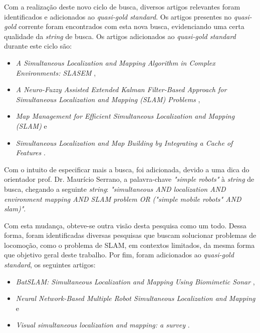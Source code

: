 		Com a realização deste novo ciclo de busca, diversos artigos relevantes foram identificados e adicionados ao \textit{quasi-gold standard}. Os artigos presentes no \textit{quasi-gold} corrente foram encontrados com esta nova busca, evidenciando uma certa qualidade da \textit{string} de busca. Os artigos adicionados ao \textit{quasi-gold standard} durante este ciclo são:

		\begin{itemize}
			\item \textit{A Simultaneous Localization and Mapping Algorithm in Complex Environments: SLASEM} \cite{slasem},
			\item \textit{A Neuro-Fuzzy Assisted Extended Kalman Filter-Based Approach for Simultaneous Localization  and  Mapping (SLAM) Problems} \cite{neurofuzzi},
			\item \textit{Map Management for Efficient Simultaneous Localization and Mapping (SLAM)} \cite{mapManagement} e
			\item \textit{Simultaneous Localization and Map Building by Integrating a Cache of Features} \cite{integratingCacheFeat}.
		\end{itemize}

		Com o intuito de especificar mais a busca, foi adicionada, devido a uma dica do orientador prof. Dr. Maurício Serrano, a palavra-chave \textit{"simple robots"} à \textit{string} de busca, chegando a seguinte \textit{string}: \textit{"simultaneous AND localization AND environment mapping AND SLAM problem OR ("simple mobile robots" AND slam)"}.

		Com esta mudança, obteve-se outra visão desta pesquisa como um todo. Dessa forma, foram identificadas diversas pesquisas que buscam solucionar problemas de locomoção, como o problema de SLAM, em contextos limitados, da mesma forma que objetivo geral deste trabalho. Por fim, foram adicionados ao \textit{quasi-gold standard}, os seguintes artigos:

		\begin{itemize}
			\item \textit{BatSLAM: Simultaneous Localization and Mapping Using Biomimetic Sonar} \cite{batslam},
			\item \textit{Neural Network-Based Multiple Robot Simultaneous Localization and Mapping} \cite{neuralNetwork} e
			\item \textit{Visual simultaneous localization and mapping: a survey} \cite{surveyLocalization}.
		\end{itemize}

